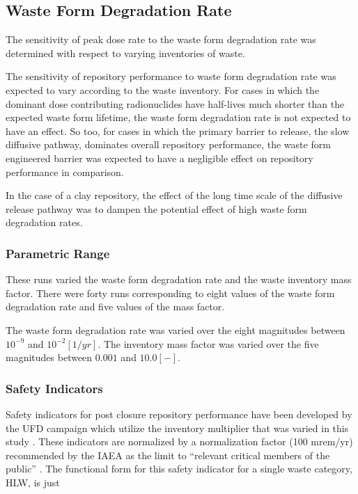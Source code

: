 
\subsection{Waste Form Degradation Rate}
\label{sed:wfdeginv}


The sensitivity of peak dose rate to the waste form degradation rate was 
determined with respect to varying inventories of waste.

The sensitivity of repository performance to waste form degradation rate was
expected to vary according to the waste inventory. For cases in which the dominant dose contributing 
radionuclides have half-lives much shorter than the expected waste form lifetime, 
the waste form degradation rate is not expected to have an effect. So too, for 
cases in which the primary barrier to release, the slow diffusive pathway, 
dominates overall repository performance, the waste form engineered barrier was
expected to have a negligible effect on repository performance in comparison.

In the case of a clay repository, the effect of the long time scale of the 
diffusive release pathway was to dampen the potential effect of high waste form 
degradation rates. 

\subsubsection{Parametric Range}

These runs varied the waste form degradation rate and the waste inventory mass 
factor.  There were forty runs corresponding to eight values of the waste form degradation 
rate and five values of the mass factor.

The waste form degradation rate was varied over the eight magnitudes 
between $10^{-9}$ and $10^{-2} [1/yr]$. The inventory mass factor was varied 
over the five magnitudes between $0.001$ and $10.0 [-]$. 

\subsubsection{Safety Indicators}
Safety indicators for post closure repository performance have been developed by 
the \gls{UFD} campaign which utilize the inventory multiplier that was varied in 
this study \cite{nutt_generic_2009}. These indicators are normalized by a 
normalization factor (100 mrem/yr) recommended by the \gls{IAEA} as the limit to 
``relevant critical members of the public'' \cite{iaea_international_1996}. The functional form for 
this safety indicator for a single waste category, \gls{HLW}, is just 

